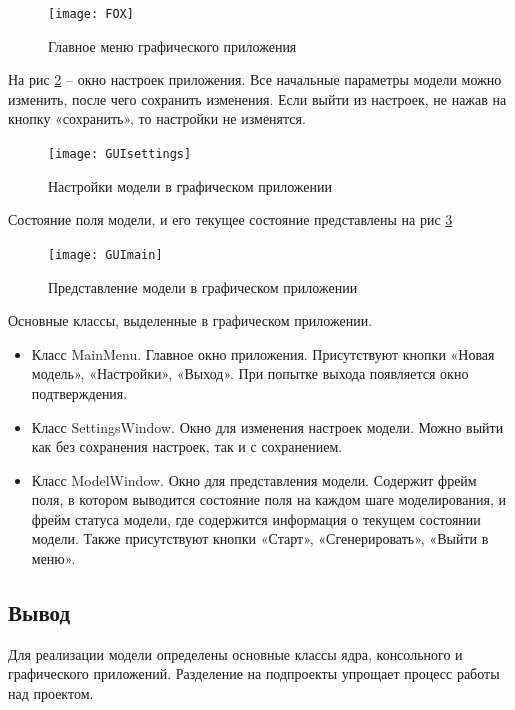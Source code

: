 \documentclass[a4paper]{article}
\begin{document}
\begin{figure}[H]
	\begin{center}
		\texttt{[image: FOX]}
		\caption{Главное меню графического приложения} 
		\label{pic:FOX} %
	\end{center}
\end{figure}

На рис \ref{pic:GUIsettings} – окно настроек приложения. Все начальные параметры модели можно изменить, после чего сохранить изменения. Если выйти из настроек, не нажав на кнопку «сохранить», то настройки не изменятся.

\begin{figure}[H]
	\begin{center}
		\texttt{[image: GUIsettings]}
		\caption{Настройки модели в графическом приложении} 
		\label{pic:GUIsettings} %
	\end{center}
\end{figure}

Состояние поля модели, и его текущее состояние представлены на рис \ref{pic:GUImain} 

\begin{figure}[H]
	\begin{center}
		\texttt{[image: GUImain]}
		\caption{Представление модели в графическом приложении} 
		\label{pic:GUImain} %
	\end{center}
\end{figure}

\noindent Основные классы, выделенные в графическом приложении. 
\begin{itemize}
\item Класс MainMenu. Главное окно приложения. Присутствуют кнопки «Новая модель», «Настройки», «Выход». При попытке выхода появляется окно подтверждения. 
\item Класс SettingsWindow. Окно для изменения настроек модели. Можно выйти как без сохранения настроек, так и с сохранением. 
\item Класс ModelWindow. Окно для представления модели. Содержит фрейм поля, в котором выводится состояние поля на каждом шаге моделирования, и фрейм статуса модели, где содержится информация о текущем состоянии модели. Также присутствуют кнопки «Старт», «Сгенерировать», «Выйти в меню».  
\end{itemize}

\subsection{Вывод}
Для реализации модели определены основные классы ядра, консольного и графического приложений. Разделение на подпроекты упрощает процесс работы над проектом.
\end{document}
